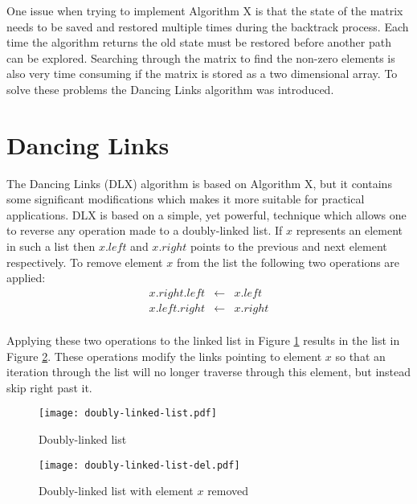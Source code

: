 One issue when trying to implement Algorithm X is that the state of the matrix needs to be saved and restored multiple times during the backtrack process.
Each time the algorithm returns the old state must be restored before another path can be explored.
Searching through the matrix to find the non-zero elements is also very time consuming if the matrix is stored as a two dimensional array.
To solve these problems the Dancing Links algorithm was introduced.



\section{Dancing Links}
\label{dlx}

The Dancing Links (DLX) algorithm is based on Algorithm X, but it contains some significant modifications which makes it more suitable for practical applications.
DLX is based on a simple, yet powerful, technique which allows one to reverse any operation made to a doubly-linked list.
If $x$ represents an element in such a list then $x.left$ and $x.right$ points to the previous and next element respectively.
To remove element $x$ from the list the following two operations are applied:
\begin{equation}
	\label{eq:remove}
	\begin{array}{rcl}
		x.right.left &\leftarrow& x.left \\
		x.left.right &\leftarrow& x.right \\
	\end{array}
\end{equation}

Applying these two operations to the linked list in Figure \ref{fig:linked} results in the list in Figure \ref{fig:linked_del}.
These operations modify the links pointing to element $x$ so that an iteration through the list will no longer traverse through this element, but instead skip right past it.
\begin{figure}[htbp]
	\centering 
	\texttt{[image: doubly-linked-list.pdf]}
	\caption{Doubly-linked list}
	\label{fig:linked}
\end{figure}
\begin{figure}[htbp]
	\centering 
	\texttt{[image: doubly-linked-list-del.pdf]}
	\caption{Doubly-linked list with element $x$ removed}
	\label{fig:linked_del}
\end{figure}

